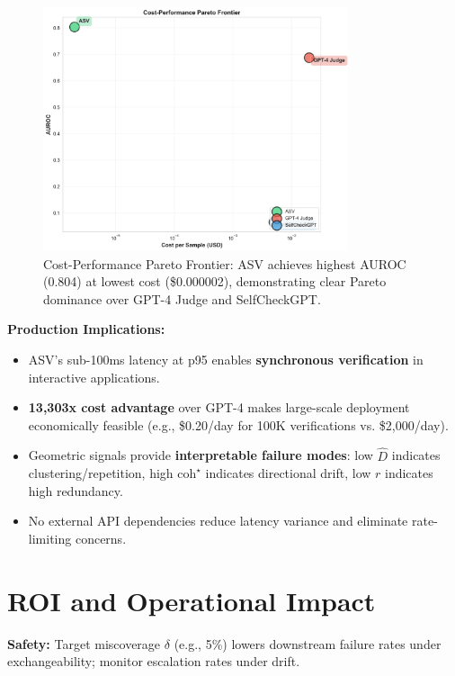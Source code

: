 \documentclass[11pt]{article}
\begin{document}
\begin{figure}[h]
\centering
\includegraphics[width=0.8\textwidth]{figures/baseline_cost_performance.png}
\caption{Cost-Performance Pareto Frontier: ASV achieves highest AUROC (0.804) at lowest cost (\$0.000002), demonstrating clear Pareto dominance over GPT-4 Judge and SelfCheckGPT.}
\label{fig:baseline-cost-performance}
\end{figure}

\textbf{Production Implications:}
\begin{itemize}
\item ASV's sub-100ms latency at p95 enables \textbf{synchronous verification} in interactive applications.
\item \textbf{13,303x cost advantage} over GPT-4 makes large-scale deployment economically feasible (e.g., \$0.20/day for 100K verifications vs. \$2,000/day).
\item Geometric signals provide \textbf{interpretable failure modes}: low $\hat{D}$ indicates clustering/repetition, high $\text{coh}^\star$ indicates directional drift, low $r$ indicates high redundancy.
\item No external API dependencies reduce latency variance and eliminate rate-limiting concerns.
\end{itemize}

\section{ROI and Operational Impact}
\label{sec:roi}

\textbf{Safety:} Target miscoverage $\delta$ (e.g., 5\%) lowers downstream failure rates under exchangeability; monitor escalation rates under drift.
\end{document}

